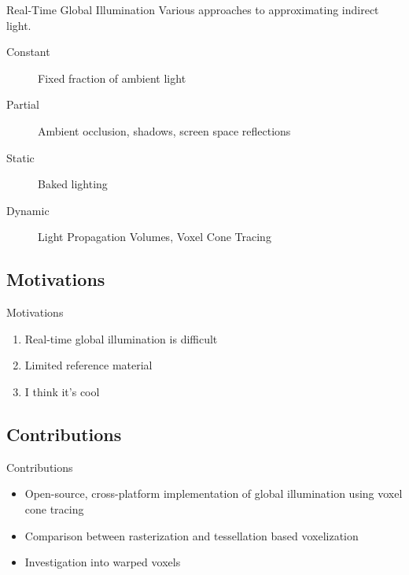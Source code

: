 \documentclass[10pt]{beamer}
\begin{document}
\begin{frame}{Real-Time Global Illumination}
  Various approaches to approximating indirect light.

  \begin{description}
    \item[Constant] Fixed fraction of ambient light %
    \item[Partial] Ambient occlusion, shadows, screen space reflections %
    \item[Static] Baked lighting
    \item[Dynamic] Light Propagation Volumes, Voxel Cone Tracing
  \end{description}
\end{frame}



\subsection{Motivations}
\begin{frame}{Motivations}
  \begin{enumerate}
    \centering
    \item Real-time global illumination is difficult %
    \item Limited reference material %
    \pause
    \item I think it's cool %
  \end{enumerate}
\end{frame}

\subsection{Contributions}
\begin{frame}{Contributions}
  \begin{itemize}
    \item Open-source, cross-platform implementation of global illumination using voxel cone tracing
    \item Comparison between rasterization and tessellation based voxelization
    \item Investigation into warped voxels %
  \end{itemize}
\end{frame}
\end{document}
